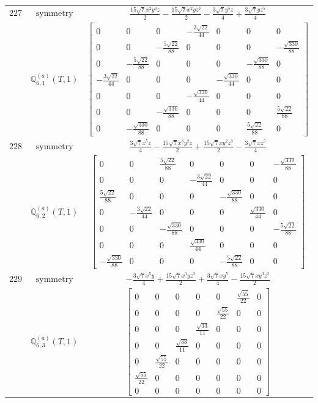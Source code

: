 \documentclass[fleqn,8pt,landscape]{jsarticle}
\begin{document}
\begin{longtable}{ccc}
$ 227 $ & $ \text{symmetry} $ & $ \frac{15 \sqrt{7} x^{2} y^{3} z}{2} - \frac{15 \sqrt{7} x^{2} y z^{3}}{2} - \frac{3 \sqrt{7} y^{5} z}{4} + \frac{3 \sqrt{7} y z^{5}}{4} $ \\
$  $ & $ \mathbb{Q}_{6,1}^{(a)}(T,1) $ & $ \begin{bmatrix} 0 & 0 & 0 & - \frac{3 \sqrt{22}}{44} & 0 & 0 & 0 \\ 0 & 0 & - \frac{5 \sqrt{22}}{88} & 0 & 0 & 0 & - \frac{\sqrt{330}}{88} \\ 0 & - \frac{5 \sqrt{22}}{88} & 0 & 0 & 0 & - \frac{\sqrt{330}}{88} & 0 \\ - \frac{3 \sqrt{22}}{44} & 0 & 0 & 0 & - \frac{\sqrt{330}}{44} & 0 & 0 \\ 0 & 0 & 0 & - \frac{\sqrt{330}}{44} & 0 & 0 & 0 \\ 0 & 0 & - \frac{\sqrt{330}}{88} & 0 & 0 & 0 & \frac{5 \sqrt{22}}{88} \\ 0 & - \frac{\sqrt{330}}{88} & 0 & 0 & 0 & \frac{5 \sqrt{22}}{88} & 0 \end{bmatrix} $ \\ \hline
$ 228 $ & $ \text{symmetry} $ & $ \frac{3 \sqrt{7} x^{5} z}{4} - \frac{15 \sqrt{7} x^{3} y^{2} z}{2} + \frac{15 \sqrt{7} x y^{2} z^{3}}{2} - \frac{3 \sqrt{7} x z^{5}}{4} $ \\
$  $ & $ \mathbb{Q}_{6,2}^{(a)}(T,1) $ & $ \begin{bmatrix} 0 & 0 & \frac{5 \sqrt{22}}{88} & 0 & 0 & 0 & - \frac{\sqrt{330}}{88} \\ 0 & 0 & 0 & - \frac{3 \sqrt{22}}{44} & 0 & 0 & 0 \\ \frac{5 \sqrt{22}}{88} & 0 & 0 & 0 & - \frac{\sqrt{330}}{88} & 0 & 0 \\ 0 & - \frac{3 \sqrt{22}}{44} & 0 & 0 & 0 & \frac{\sqrt{330}}{44} & 0 \\ 0 & 0 & - \frac{\sqrt{330}}{88} & 0 & 0 & 0 & - \frac{5 \sqrt{22}}{88} \\ 0 & 0 & 0 & \frac{\sqrt{330}}{44} & 0 & 0 & 0 \\ - \frac{\sqrt{330}}{88} & 0 & 0 & 0 & - \frac{5 \sqrt{22}}{88} & 0 & 0 \end{bmatrix} $ \\ \hline
$ 229 $ & $ \text{symmetry} $ & $ - \frac{3 \sqrt{7} x^{5} y}{4} + \frac{15 \sqrt{7} x^{3} y z^{2}}{2} + \frac{3 \sqrt{7} x y^{5}}{4} - \frac{15 \sqrt{7} x y^{3} z^{2}}{2} $ \\
$  $ & $ \mathbb{Q}_{6,3}^{(a)}(T,1) $ & $ \begin{bmatrix} 0 & 0 & 0 & 0 & 0 & \frac{\sqrt{55}}{22} & 0 \\ 0 & 0 & 0 & 0 & \frac{\sqrt{55}}{22} & 0 & 0 \\ 0 & 0 & 0 & \frac{\sqrt{33}}{11} & 0 & 0 & 0 \\ 0 & 0 & \frac{\sqrt{33}}{11} & 0 & 0 & 0 & 0 \\ 0 & \frac{\sqrt{55}}{22} & 0 & 0 & 0 & 0 & 0 \\ \frac{\sqrt{55}}{22} & 0 & 0 & 0 & 0 & 0 & 0 \\ 0 & 0 & 0 & 0 & 0 & 0 & 0 \end{bmatrix} $ \\ \hline

\end{longtable}
\end{document}
